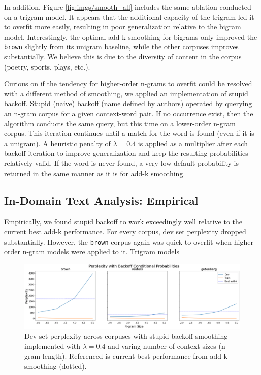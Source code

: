 \documentclass[11pt,a4paper]{article}
\begin{document}
In addition, Figure \ref{fig:imgs/smooth_all} includes the same ablation conducted on a trigram model. It appears that the 
additional capacity of the trigram led it to overfit more easily, resulting in poor generalization relative to the bigram model.
Interestingly, the optimal add-k smoothing for bigrams only improved the \texttt{brown} slightly from its unigram baseline, while
the other corpuses improves substantially. We believe this is due to the diversity of content in the corpus (poetry, sports, plays, etc.).

Curious on if the tendency for higher-order n-grams to overfit could be resolved with a different method of smoothing, we applied an
implementation of stupid backoff. Stupid (naive) backoff (name defined by authors) \cite{brants2007large} operated by querying an n-gram corpus
for a given context-word pair. If no occurrence exist, then the algorithm conducts the same query, but this time on a lower-order n-gram corpus. 
This iteration continues until a match for the word is found (even if it is a unigram). A heuristic penalty of $\lambda = 0.4$ is applied as a 
multiplier after each backoff iteration to improve generalization and keep the resulting probabilities relatively valid. If the word is never found, 
a very low default probability is returned in the same manner as it is for add-k smoothing.



\subsection{In-Domain Text Analysis: Empirical}%
\label{sec:in_domain_text_analysis_empirical}

Empirically, we found stupid backoff to work exceedingly well relative to the current best add-k performance. For every corpus, dev set perplexity
dropped substantially. However, the \texttt{brown} corpus again was quick to overfit when higher-order n-gram models were applied to it. Trigram models
\FloatBarrier
\begin{figure}[htpb]
  \centering
  \includegraphics[width=1\linewidth]{imgs/backoff.png}
  \caption{Dev-set perplexity across corpuses with stupid backoff
  smoothing implemented with $\lambda=0.4$ and varing number of
  context sizes (n-gram length). Referenced is current best 
performance from add-k smoothing (dotted).}
  \label{fig:backoff}
  \vspace{-15pt}
\end{figure}
\FloatBarrier
\end{document}
